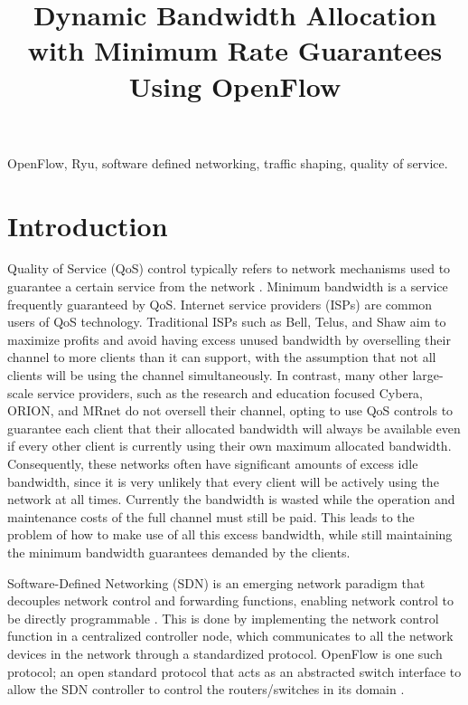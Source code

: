 \documentclass[accepted,single]{gipaper}
\title{Dynamic Bandwidth Allocation with Minimum Rate Guarantees Using OpenFlow}
\affiliation{
    Department of Computer Science \\
    University of Calgary
}
\begin{document}
\begin{keywords}
OpenFlow, Ryu, software defined networking, traffic shaping, quality of service.
\end{keywords}

\section{Introduction}
\label{intro}

Quality of Service (QoS) control typically refers to network mechanisms used to guarantee a certain service from the network \cite{Krishna:2016}. Minimum bandwidth is a service frequently guaranteed by QoS. Internet service providers (ISPs) are common users of QoS technology. Traditional ISPs such as Bell, Telus, and Shaw aim to maximize profits and avoid having excess unused bandwidth by overselling their channel to more clients than it can support, with the assumption that not all clients will be using the channel simultaneously. In contrast, many other large-scale service providers, such as the research and education focused Cybera, ORION, and MRnet do not oversell their channel, opting to use QoS controls to guarantee each client that their allocated bandwidth will always be available even if every other client is currently using their own maximum allocated bandwidth. Consequently, these networks often have significant amounts of excess idle bandwidth, since it is very unlikely that every client will be actively using the network at all times. Currently the bandwidth is wasted while the operation and maintenance costs of the full channel must still be paid. This leads to the problem of how to make use of all this excess bandwidth, while still maintaining the minimum bandwidth guarantees demanded by the clients.

\hspace{10mm} Software-Defined Networking (SDN) is an emerging network paradigm that decouples network control and forwarding functions, enabling network control to be directly programmable \cite{opennetworking}. This is done by implementing the network control function in a centralized controller node, which communicates to all the network devices in the network through a standardized protocol. OpenFlow is one such protocol; an open standard protocol that acts as an abstracted switch interface to allow the SDN controller to control the routers/switches in its domain \cite{sdx}.
\end{document}

